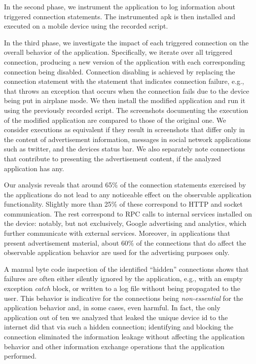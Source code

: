 In the second phase, we instrument the application to log information about 
triggered connection statements. The instrumented apk is then installed and executed on a mobile device using the recorded script. 

In the third phase, we investigate the impact of each triggered connection on the overall behavior of the application.
Specifically, we iterate over all triggered connection, producing a new version of the application with each corresponding connection being disabled. Connection disabling is achieved by replacing the connection statement with the
statement that indicates connection failure, e.g., that throws an exception that occurs when the connection fails due to the device being put in airplane mode. 
We then install the modified application and run it using the previously recorded script. The screenshots documenting 
the execution of the modified application are compared to those of the original one. We consider executions as equivalent if they result in screenshots that differ only in the content of advertisement information, messages in social network applications such as twitter, and the devices status bar. 
We also separately note connections that contribute to presenting the advertisement content, if the analyzed application has any. 

Our analysis reveals that around 65\% of the connection statements exercised by the applications do not lead to any noticeable effect on the observable application functionality.
Slightly more than 25\% of these correspond to HTTP and socket communication. The rest correspond to RPC calls to internal services installed on the device: notably, but not exclusively, Google advertising and analytics, which further communicate with external services. 
Moreover, in applications that present advertisement material, about 60\% of the connections that do affect the observable application behavior are used for the advertising purposes only. 

A manual byte code inspection of the identified ``hidden'' connections shows that failures are often either silently ignored by the application, e.g., with an empty exception \emph{catch} block, or written to a log file without being propagated to the user. 
This behavior is indicative for the connections being \emph{non-essential} for the application behavior and, in some cases, even harmful. 
%
In fact, the only application out of ten we analyzed that leaked the unique device id to the internet did that via such a hidden connection; 
identifying and blocking the connection eliminated the information leakage without affecting the application behavior and other information exchange 
operations that the application performed. 


